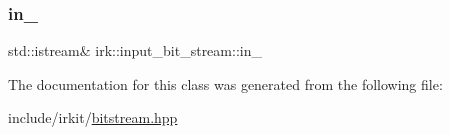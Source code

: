 \mbox{\label{classirk_1_1input__bit__stream_a3513799a1ea6025e9e6fc2c83a530b6a}} 
\subsubsection{\texorpdfstring{in\+\_\+}{in\_}}
{\footnotesize\ttfamily std\+::istream\& irk\+::input\+\_\+bit\+\_\+stream\+::in\+\_\+\hspace{0.3cm}{\ttfamily [protected]}}



The documentation for this class was generated from the following file\+:\begin{DoxyCompactItemize}
\item 
include/irkit/\mbox{\hyperlink{bitstream_8hpp}{bitstream.\+hpp}}\end{DoxyCompactItemize}
